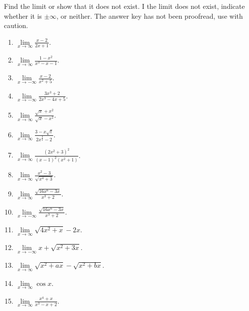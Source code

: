 Find the limit or show that it does not exist. I the limit does not exist, indicate whether it is $\pm\infty$, or neither. The answer key has not been proofread, use with caution.
\begin{multicols}{3}
\begin{enumerate}
\item $\lim\limits_{x\to\infty }\frac{x-2}{2x+1}$.

\item $\lim\limits_{x\to\infty }\frac{1-x^2}{x^3-x-1}$.

\item $\lim\limits_{x\to-\infty }\frac{x-2}{x^2+5}$.

\item $\lim\limits_{x\to-\infty }\frac{3x^3+2}{2x^3-4x+5}$.

\item $\lim\limits_{x\to\infty }\frac{\sqrt{x}+x^2}{\sqrt{x}-x^2}$.

\item $\lim\limits_{x\to\infty }\frac{3-x\sqrt{t}}{2x^{\frac{3}{2}}-2}$.

\item $\lim\limits_{x\to\infty }\frac{(2x^2+3)^2}{(x-1)^2(x^2+1)}$.

\item $\lim\limits_{x\to\infty }\frac{x^2-3}{\sqrt{x^4+3}}$.

\item $\lim\limits_{x\to\infty }\frac{\sqrt{16x^6-3x}}{x^3+2}$.

\item $\lim\limits_{x\to-\infty }\frac{\sqrt{16x^6-3x}}{x^3+2}$.

\item $\lim\limits_{x\to\infty}\sqrt{4x^2+x}-2x$.

\item $\lim\limits_{x\to-\infty} x+\sqrt{x^2+3x} $.

\item $\lim\limits_{x\to\infty}\sqrt{x^2+ax}-\sqrt{x^2+bx}$.

\item $\lim\limits_{x\to\infty}\cos x$.

\item $\lim\limits_{x\to\infty}\frac{x^4+x}{x^3-x+2}$.


\end{enumerate}
\end{multicols}
